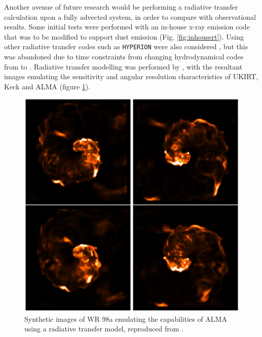 Another avenue of future research would be performing a radiative transfer calculation upon a fully advected system, in order to compare with observational results.
Some initial tests were performed with an in-house x-ray emission code that was to be modified to support dust emission (Fig. \ref{fig:inhousert}).
Using other radiative transfer codes such as \texttt{HYPERION} were also considered \parencite{robitailleHYPERIONOpensourceParallelized2011}, but this was abandoned due to time constraints from changing hydrodynamical codes from \mg{} to \athena{}.
Radiative transfer modelling was performed by \textcite{hendrix_pinwheels_2016}, with the resultant images emulating the sensitivity and angular resolution characteristics of UKIRT, Keck and ALMA (figure \ref{fig:hendrix-synthetic}).

\begin{figure}[ht]
  \centering
  \includegraphics{assets/hendrix-synthetic-observation.jpeg}
  \caption[\textit{Radiative transfer images of WR98a \parencite{hendrix_pinwheels_2016}}]{Synthetic images of WR 98a emulating the capabilities of ALMA using a radiative transfer model, reproduced from \textcite{hendrix_pinwheels_2016}.}
  \label{fig:hendrix-synthetic}
\end{figure}
